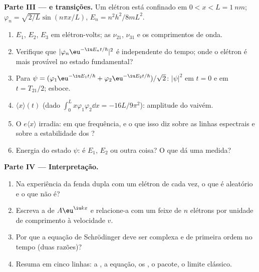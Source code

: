 \begin{problem}
\textbf{Parte III ---  e transições.}
Um elétron está confinado em $0 < x < L = \qty{1}{nm}$; $\varphi_n =
\sqrt{2/L}\sin(n\pi x/L)$, $E_n = n^2h^2/8mL^2$.
\begin{enumerate}[resume]
  \item $E_1$, $E_2$, $E_3$ em elétron-volts; as 
        $\nu_{21}$, $\nu_{31}$ e os comprimentos de onda.
  \item Verifique que $|\varphi_n\eu^{-\iu E_nt/\hbar}|^2$ é independente do tempo;
        onde o elétron é mais provável no estado fundamental?
  \item Para $\psi = (\varphi_1\eu^{-\iu E_1t/\hbar} + \varphi_2\eu^{-\iu E_2t/\hbar})/
        \sqrt2$: $|\psi|^2$ em $t = 0$ e em $t = T_{21}/2$; esboce.
  \item $\langle x\rangle(t)$ (dado $\int_0^Lx\varphi_1\varphi_2\dd x = -16L/9\pi^2$):
        amplitude do vaivém.
  \item O  $e\langle x\rangle$ irradia: em que
        frequência, e o que isso diz sobre as linhas espectrais e
        sobre a estabilidade dos ?
  \item Energia do estado $\psi$: é $E_1$, $E_2$ ou outra coisa?
        O que dá uma medida?
\end{enumerate}

\textbf{Parte IV --- Interpretação.}
\begin{enumerate}[resume]
  \item Na experiência da fenda dupla com um elétron de cada vez, o que é aleatório
        e o que não é?
  \item Escreva a  de $A\eu^{\iu kx}$ e relacione-a com
        um feixe de $n$ elétrons por unidade de comprimento à velocidade $v$.
  \item Por que a equação de Schrödinger deve ser complexa e de primeira ordem
        no tempo (duas razões)?
  \item Resuma em cinco linhas: a , a equação, os
        , o pacote, o limite clássico.
\end{enumerate}
\end{problem}
